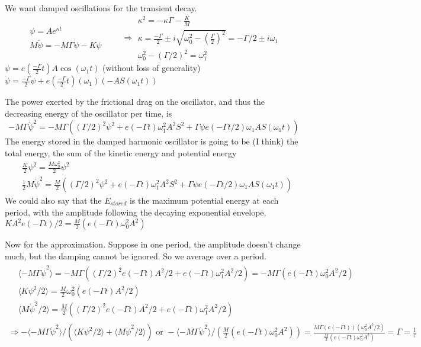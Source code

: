 \documentclass[twoside,10pt]{amsart}
\newcommand{\problemhead}[1]
  {\smallskip
   \noindent{\large\bf Problem #1.}
   \smallskip}
\begin{document}
\problemhead{6.9}
We want damped oscillations for the transient decay.  
\[
\begin{gathered}
  \psi = A e^{\kappa t} \\
  M\ddot{\psi} = -M \Gamma \dot{\psi} - K \psi
\end{gathered} \quad \quad \Longrightarrow 
\begin{gathered}
  \kappa^2 = - \kappa \Gamma - \frac{K}{M} \\
  \kappa = \frac{ -\Gamma }{2} \pm i \sqrt{ \omega_0^2 - \left( \frac{\Gamma}{2} \right)^2 } = -\Gamma/2 \pm i \omega_1 \\
  \omega_0^2 -(\Gamma/2)^2 = \omega_1^2 
\end{gathered}
\]
$\psi = e\left( \frac{-\Gamma}{2} t \right) A \cos{(\omega_1 t) }$ (without loss of generality) \\
$\dot{\psi} = \frac{-\Gamma}{2} \psi + e\left( \frac{-\Gamma}{2} t \right) (\omega_1) (-A S(\omega_1 t))$

The power exerted by the frictional drag on the oscillator, and thus the decreasing energy of the oscillator per time, is 
\[
-M\Gamma \dot{\psi}^2 = -M \Gamma ( (\Gamma/2)^2 \psi^2 + e(-\Gamma t) \omega_1^2 A^2 S^2 + \Gamma \psi e(-\Gamma t/2) \omega_1 A S(\omega_1 t) )
\]
The energy stored in the damped harmonic oscillator is going to be (I think) the total energy, the sum of the kinetic energy and potential energy 
\[
\begin{aligned}
  & \frac{K}{2} \psi^2 = \frac{M \omega_0^2}{2} \psi^2  \\
  & \frac{1}{2} M \dot{\psi}^2 = \frac{M}{2} ( (\Gamma/2)^2 \psi^2 + e(-\Gamma t) \omega_1^2 A^2 S^2 + \Gamma \psi e(-\Gamma t/2) \omega_1 A S(\omega_1 t) )
\end{aligned}
\]
We could also say that the $E_{stored}$ is the maximum potential energy at each period, with the amplitude following the decaying exponential envelope, $KA^2 e(-\Gamma t)/2 = \frac{M}{2} (e(-\Gamma t) \omega_0^2 A^2 )$

Now for the approximation.  Suppose in one period, the amplitude doesn't change much, but the damping cannot be ignored.  So we average over a period. 
\[
\begin{gathered}
  \begin{aligned}
    & \langle -M \Gamma \dot{\psi}^2 \rangle = - M \Gamma ( (\Gamma/2)^2 e(-\Gamma t) A^2 /2 + e(-\Gamma t) \omega_1^2 A^2/2 ) = -M\Gamma ( e(-\Gamma t) \omega_0^2 A^2/2 ) \\
    & \langle K \psi^2/2 \rangle = \frac{M}{2} \omega_0^2 (e(-\Gamma t) A^2/2) \\
    & \langle M \dot{\psi}^2/2 \rangle = \frac{M}{2} ( (\Gamma/2)^2 e(-\Gamma t) A^2 /2 + e(-\Gamma t) \omega_1^2 A^2/2 )
  \end{aligned} \\
\Longrightarrow -\langle -M\Gamma \dot{\psi}^2 \rangle / (\langle K\psi^2/2 \rangle + \langle M\dot{\psi}^2/2 \rangle ) \text{ or } -\langle -M \Gamma \dot{\psi}^2 \rangle / \left( \frac{M}{2} (e(-\Gamma t) \omega_0^2 A^2 ) \right) = \frac{ M \Gamma (e(-\Gamma t))(\omega_0^2 A^2/2 ) }{ \frac{M}{2} (e(-\Gamma t) \omega_0^2 A^2) }= \Gamma = \frac{1}{\tau}
\end{gathered}
\]
\end{document}
